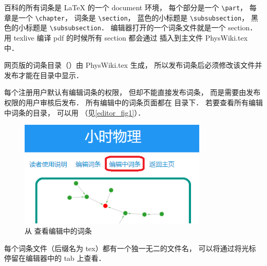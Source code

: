 百科的所有词条是 LaTeX 的一个 document 环境， 每个部分是一个 \lstinline|\part|， 每章是一个 \lstinline|\chapter|， 词条是 \lstinline|\section|， 蓝色的小标题是 \lstinline|\subsubsection|， 黑色的小标题是 \lstinline|\subsubsection|． 编辑器打开的一个词条文件就是一个 section． 用 texlive 编译 pdf 的时候所有 section 都会通过 \lstinline|| 插入到主文件 PhysWiki.tex 中．

网页版的词条目录（）由 PhysWiki.tex 生成， 所以发布词条后必须修改该文件并发布才能在目录中显示．

每个注册用户默认有编辑词条的权限， 但却不能直接发布词条， 而是需要由发布权限的用户审核后发布． 所有编辑中的词条页面都在  目录下． 若要查看所有编辑中词条的目录， 可以用 （见\autoref{editor_fig1}）．

\begin{figure}[ht]
\centering
\includegraphics[width=9cm]{./figures/editor1.png}
\caption{从  查看编辑中的词条} \label{editor_fig1}
\end{figure}

每个词条文件（后缀名为 tex）都有一个独一无二的文件名， 可以将通过将光标停留在编辑器中的 tab 上查看．

